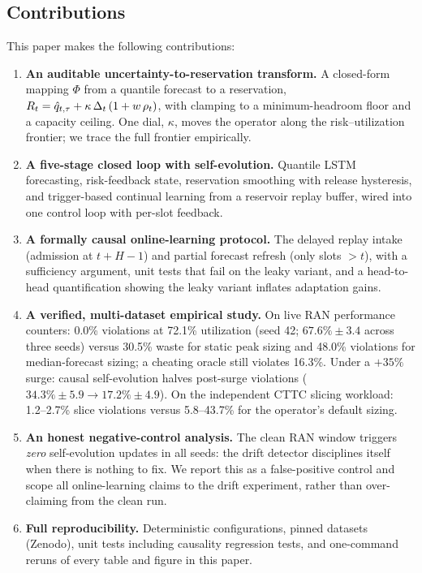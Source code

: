 \subsection{Contributions}

This paper makes the following contributions:

\begin{enumerate}
\item \textbf{An auditable uncertainty-to-reservation transform.} A
closed-form mapping $\Phi$ from a quantile forecast to a reservation,
$R_t = \hat{q}_{t,\tau} + \kappa\,\Delta_t\,(1 + w\,\rho_t)$, with clamping to
a minimum-headroom floor and a capacity ceiling. One dial, $\kappa$,
moves the operator along the risk--utilization frontier; we trace the
full frontier empirically.
\item \textbf{A five-stage closed loop with self-evolution.} Quantile
LSTM forecasting, risk-feedback state, reservation smoothing with
release hysteresis, and trigger-based continual learning from a
reservoir replay buffer, wired into one control loop with per-slot
feedback.
\item \textbf{A formally causal online-learning protocol.} The
delayed replay intake (admission at $t+H-1$) and partial forecast
refresh (only slots $>t$), with a sufficiency argument, unit tests
that fail on the leaky variant, and a head-to-head quantification
showing the leaky variant inflates adaptation gains.
\item \textbf{A verified, multi-dataset empirical study.} On live RAN
performance counters: 0.0\% violations at 72.1\% utilization (seed
42; $67.6\%\pm3.4$ across three seeds) versus 30.5\% waste for static
peak sizing and 48.0\% violations for median-forecast sizing; a
cheating oracle still violates 16.3\%. Under a $+35\%$ surge: causal
self-evolution halves post-surge violations ($34.3\%\pm5.9
\rightarrow 17.2\%\pm4.9$). On the independent CTTC slicing workload:
1.2--2.7\% slice violations versus 5.8--43.7\% for the operator's
default sizing.
\item \textbf{An honest negative-control analysis.} The clean RAN
window triggers \emph{zero} self-evolution updates in all seeds: the
drift detector disciplines itself when there is nothing to fix. We
report this as a false-positive control and scope all online-learning
claims to the drift experiment, rather than over-claiming from the
clean run.
\item \textbf{Full reproducibility.} Deterministic configurations,
pinned datasets (Zenodo), unit tests including causality regression
tests, and one-command reruns of every table and figure in this
paper.
\end{enumerate}

